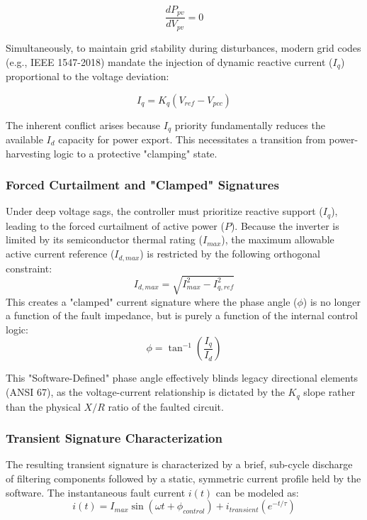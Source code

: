 \begin{equation}
\label{eq:vtdq}
\frac{dP_{pv}}{dV_{pv}} = 0
\end{equation}

Simultaneously, to maintain grid stability during disturbances, modern grid codes (e.g., IEEE 1547-2018) mandate the injection of dynamic reactive current ($I_q$) proportional to the voltage deviation:

\begin{equation}
\label{eq:vtdq}
I_q = K_q(V_{ref} - V_{pcc}) 
\end{equation}


The inherent conflict arises because $I_q$ priority fundamentally reduces the available $I_d$ capacity for power export. This necessitates a transition from power-harvesting logic to a protective "clamping" state.

\subsubsection{Forced Curtailment and "Clamped" Signatures}
Under deep voltage sags, the controller must prioritize reactive support ($I_q$), leading to the forced curtailment of active power ($P$). Because the inverter is limited by its semiconductor thermal rating ($I_{max}$), the maximum allowable active current reference ($I_{d,max}$) is restricted by the following orthogonal constraint:
\begin{equation}
\label{eq:vtdq}
I_{d,max} = \sqrt{I_{max}^2 - I_{q,ref}^2}
\end{equation}
This creates a "clamped" current signature where the phase angle ($\phi$) is no longer a function of the fault impedance, but is purely a function of the internal control logic:
\begin{equation}
\label{eq:vtdq}
\phi = \tan^{-1}\left(\frac{I_q}{I_d}\right)
\end{equation}

This "Software-Defined" phase angle effectively blinds legacy directional elements (ANSI 67), as the voltage-current relationship is dictated by the $K_q$ slope rather than the physical $X/R$ ratio of the faulted circuit.

\subsubsection{Transient Signature Characterization}
The resulting transient signature is characterized by a brief, sub-cycle discharge of filtering components followed by a static, symmetric current profile held by the software. The instantaneous fault current $i(t)$ can be modeled as:
\begin{equation}
\label{eq:vtdq}
i(t) = I_{max} \sin(\omega t + \phi_{control}) + i_{transient}(e^{-t/\tau}) 
\end{equation}

